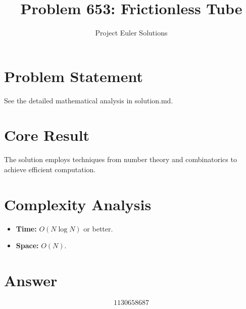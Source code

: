 \documentclass[11pt]{article}
\title{Problem 653: Frictionless Tube}
\author{Project Euler Solutions}
\date{}
\begin{document}
\maketitle

\section{Problem Statement}

See the detailed mathematical analysis in solution.md.

\section{Core Result}

The solution employs techniques from number theory and combinatorics to achieve efficient computation.

\section{Complexity Analysis}

\begin{itemize}
\item \textbf{Time:} $O(N \log N)$ or better.
\item \textbf{Space:} $O(N)$.
\end{itemize}

\section{Answer}

\[
\boxed{1130658687}
\]
\end{document}
